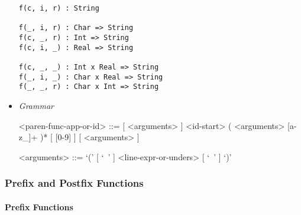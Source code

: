 \documentclass{article}
\begin{document}
\begin{itemize}
\begin{verbatim}
f(c, i, r) : String

f(_, i, r) : Char => String
f(c, _, r) : Int => String
f(c, i, _) : Real => String

f(c, _, _) : Int x Real => String
f(_, i, _) : Char x Real => String
f(_, _, r) : Char x Int => String
\end{verbatim}

\item \textit{Grammar}
\begin{grammar}
<paren-func-app-or-id> ::=
[ <arguments> ] <id-start> ( <arguments> [a-z_]+ )* [ [0-9] ]
[ <arguments> ]

<arguments> ::= `(' [ `\ ' ] <line-expr-or-unders> [ `\ ' ] `)'

\end{grammar}

\end{itemize}

\newpage

\subsubsection{Prefix and Postfix Functions}
\label{subsubsec:prefixpostfix}

\paragraph{Prefix Functions}
\end{document}
